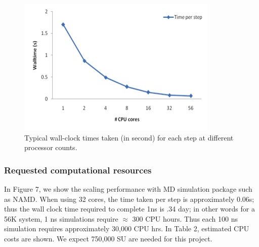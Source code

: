 \documentclass[a4paper,10pt]{article}
\begin{document}

\begin{figure}
   \includegraphics[scale=0.660]{56k_scaling-2}
\caption{Typical wall-clock times taken (in second) for each step at different processor counts.}
\end{figure}


\subsubsection*{Requested computational resources}

In Figure 7, we show the scaling performance with MD simulation package such as NAMD.  When using 32 cores, the time taken per step is approximately 0.06s; thus the wall clock time required to complete 1ns is .34 day; in other words for a 56K system, 1 ns simulations require $\approx$ 300 CPU hours. Thus each 100 ns simulation requires approximately 30,000 CPU hrs. In Table 2, estimated CPU costs are shown.  We expect 750,000 SU are needed for this project.

\end{document}

